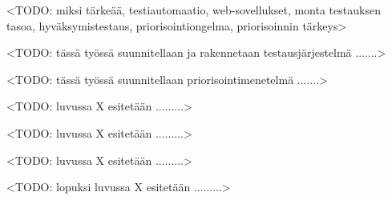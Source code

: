 <TODO: miksi tärkeää, testiautomaatio,  web-sovellukset,  monta testauksen tasoa, hyväksymistestaus, priorisointiongelma, priorisoinnin tärkeys>

<TODO: tässä työssä suunnitellaan ja rakennetaan testausjärjestelmä .......>

<TODO: tässä työssä suunnitellaan priorisointimenetelmä .......>

<TODO: luvussa X esitetään .........>

<TODO: luvussa X esitetään .........>

<TODO: luvussa X esitetään .........>

<TODO: lopuksi luvussa X esitetään .........>
